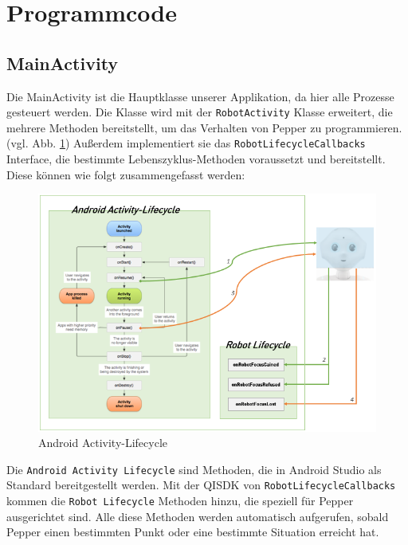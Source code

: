 \section{Programmcode}

\subsection{MainActivity}

Die MainActivity ist die Hauptklasse unserer Applikation, da hier alle Prozesse gesteuert werden. Die Klasse wird mit der 
\verb|RobotActivity| Klasse erweitert, die mehrere Methoden bereitstellt, um das Verhalten von Pepper zu programmieren. 
(vgl. Abb. \ref{fig:AAL}) Außerdem implementiert sie das \verb|RobotLifecycleCallbacks| Interface, die bestimmte Lebenszyklus-Methoden voraussetzt 
und bereitstellt.\\ 
Diese können wie folgt zusammengefasst werden:\\

\begin{figure}[H]
    \includegraphics[width=\textwidth]{Figures/AppChapter/4_1_3.png}
    \caption{Android Activity-Lifecycle \cite{AALife}}
    \label{fig:AAL}
    \centering
\end{figure}

Die \verb|Android Activity Lifecycle| sind Methoden, die in Android Studio als Standard bereitgestellt werden. Mit der QISDK von 
\verb|RobotLifecycleCallbacks| kommen die \verb|Robot Lifecycle| Methoden hinzu, die speziell für Pepper ausgerichtet sind. 
Alle diese Methoden werden automatisch aufgerufen, sobald Pepper einen bestimmten Punkt oder eine bestimmte Situation erreicht hat. 

